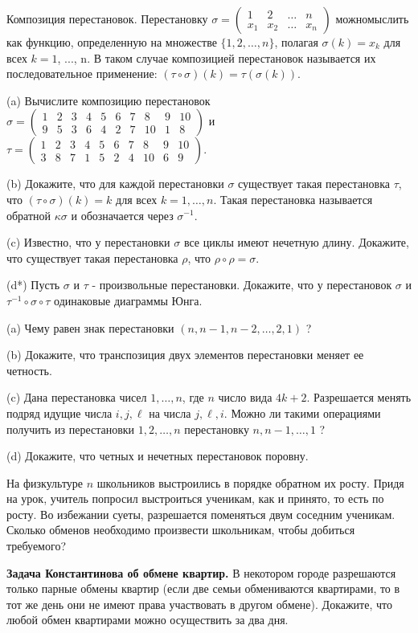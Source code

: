 Композиция перестановок. Перестановку $\sigma=\left(\begin{array}{cccc}1 & 2 & \ldots & n \\ x_1 & x_2 & \ldots & x_n\end{array}\right)$ можномыслить как функцию, определенную на множестве $\{1,2, \ldots, n\}$, полагая $\sigma(k)=x_k$ для всех $k=1$, ..., n. В таком случае композицией перестановок называется их последовательное применение: $(\tau \circ \sigma)(k)=\tau(\sigma(k))$.

(a) Вычислите композицию перестановок $\sigma=\left(\begin{array}{cccccccccc}1 & 2 & 3 & 4 & 5 & 6 & 7 & 8 & 9 & 10 \\ 9 & 5 & 3 & 6 & 4 & 2 & 7 & 10 & 1 & 8\end{array}\right)$ и $\tau=\left(\begin{array}{lllllllccc}1 & 2 & 3 & 4 & 5 & 6 & 7 & 8 & 9 & 10 \\ 3 & 8 & 7 & 1 & 5 & 2 & 4 & 10 & 6 & 9\end{array}\right)$.

(b) Докажите, что для каждой перестановки $\sigma$ существует такая перестановка $\tau$, что $(\tau \circ \sigma)(k)=k$ для всех $k=1, \ldots, n$. Такая перестановка называется обратной $\kappa \sigma$ и обозначается через $\sigma^{-1}$.

(c) Известно, что у перестановки $\sigma$ все циклы имеют нечетную длину. Докажите, что существует такая перестановка $\rho$, что $\rho \circ \rho=\sigma$.

(d*) Пусть $\sigma$ и $\tau$ - произвольные перестановки. Докажите, что у перестановок $\sigma$ и $\tau^{-1} \circ \sigma \circ \tau$ одинаковые диаграммы Юнга.


(a) Чему равен знак перестановки $(n, n-1, n-2, \ldots, 2,1)$ ?

(b) Докажите, что транспозиция двух элементов перестановки меняет ее четность.

(c) Дана перестановка чисел $1, \ldots, n$, где $n$ число вида $4 k+2$. Разрешается менять подряд идущие числа $i, j, \ell$ на числа $j, \ell, i$. Можно ли такими операциями получить из перестановки $1,2, \ldots, n$ перестановку $n, n-1, \ldots, 1$ ?

(d) Докажите, что четных и нечетных перестановок поровну.

На физкультуре $n$ школьников выстроились в порядке обратном их росту. Придя на урок, учитель попросил выстроиться ученикам, как и принято, то есть по росту. Во избежании суеты, разрешается поменяться двум соседним ученикам. Сколько обменов необходимо произвести школьникам, чтобы добиться требуемого?

\textbf{Задача Константинова об обмене квартир.}
В некотором городе разрешаются только парные обмены квартир (если две семьи обмениваются квартирами, то в тот же день они не имеют права участвовать в другом обмене). Докажите, что любой обмен квартирами можно осуществить за два дня.